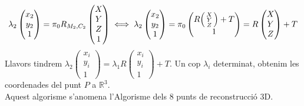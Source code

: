\documentclass[a4paper,12pt]{article}
\begin{document}
\begin{enumerate}
\begin{displaymath}
			\lambda_2 \begin{pmatrix}x_2\\y_2\\1\end{pmatrix} = \pi_0 R_{M_2, C_2} \begin{pmatrix}X\\Y\\Z\\1\end{pmatrix} \iff \lambda_2 \begin{pmatrix}x_2\\y_2\\1\end{pmatrix} = \pi_0 \begin{pmatrix}R\begin{psmallmatrix}X\\Y\\Z\end{psmallmatrix} + T\\1\end{pmatrix} = R\begin{pmatrix}X\\Y\\Z\end{pmatrix} + T
		\end{displaymath}
		Llavors tindrem $\lambda_2 \begin{pmatrix}x_i \\ y_i \\ 1\end{pmatrix} = \lambda_1 R \begin{pmatrix}x_i\\y_i\\1\end{pmatrix} + T$. Un cop $\lambda_i$ determinat, obtenim les coordenades del punt $P$ a $\mathbb{R}^3$.\\
		Aquest algorisme s'anomena l'Algorisme dels 8 punts de reconstrucció 3D.
	\end{enumerate}
\end{document}
